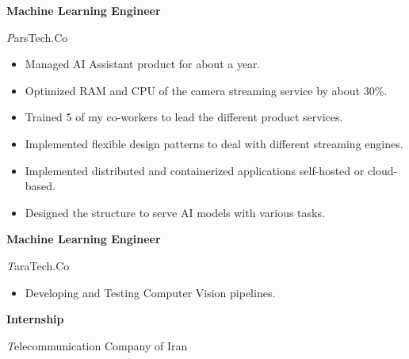 \begin{rubric}{}

\entry*[2021 -- present]%
	\textbf{Machine Learning Engineer} \par {\emph ParsTech.Co}
        \begin{itemize}
          \setlength{\itemsep}{0ex} %
          \setlength{\parskip}{1pt}     %
          \item Managed AI Assistant product for about a year.
          \item Optimized RAM and CPU of the camera streaming service by about 30\%.
          \item Trained 5 of my co-workers to lead the different product services.
          \item Implemented flexible design patterns to deal with different streaming engines.
          \item Implemented distributed and containerized applications self-hosted or cloud-based.
          \item Designed the structure to serve AI models with various tasks.
        \end{itemize}



\entry*[2020 -- 2021]%
	\textbf{Machine Learning Engineer} \par {\emph TaraTech.Co}

        \begin{itemize}
          \setlength{\itemsep}{0ex} %
          \setlength{\parskip}{1pt}     %
            \item  Developing and Testing Computer Vision pipelines.
        \end{itemize}
        
\entry*[2019 -- 2020]%
	\textbf{Internship} \par {\emph Telecommunication Company of Iran} 


\end{rubric}
